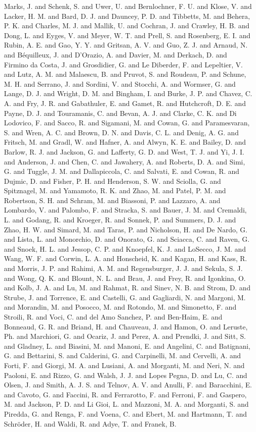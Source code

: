 {Marks, J. and Schenk, S. and Uwer, U. and Bernlochner, F. U. and Klose, V. and Lacker, H. M. and Bard, D. J. and Dauncey, P. D. and Tibbetts, M. and Behera, P. K. and Charles, M. J. and Mallik, U. and Cochran, J. and Crawley, H. B. and Dong, L. and Eyges, V. and Meyer, W. T. and Prell, S. and Rosenberg, E. I. and Rubin, A. E. and Gao, Y. Y. and Gritsan, A. V. and Guo, Z. J. and Arnaud, N. and Béquilleux, J. and D’Orazio, A. and Davier, M. and Derkach, D. and Firmino da Costa, J. and Grosdidier, G. and Le Diberder, F. and Lepeltier, V. and Lutz, A. M. and Malaescu, B. and Pruvot, S. and Roudeau, P. and Schune, M. H. and Serrano, J. and Sordini, V. and Stocchi, A. and Wormser, G. and Lange, D. J. and Wright, D. M. and Bingham, I. and Burke, J. P. and Chavez, C. A. and Fry, J. R. and Gabathuler, E. and Gamet, R. and Hutchcroft, D. E. and Payne, D. J. and Touramanis, C. and Bevan, A. J. and Clarke, C. K. and Di Lodovico, F. and Sacco, R. and Sigamani, M. and Cowan, G. and Paramesvaran, S. and Wren, A. C. and Brown, D. N. and Davis, C. L. and Denig, A. G. and Fritsch, M. and Gradl, W. and Hafner, A. and Alwyn, K. E. and Bailey, D. and Barlow, R. J. and Jackson, G. and Lafferty, G. D. and West, T. J. and Yi, J. I. and Anderson, J. and Chen, C. and Jawahery, A. and Roberts, D. A. and Simi, G. and Tuggle, J. M. and Dallapiccola, C. and Salvati, E. and Cowan, R. and Dujmic, D. and Fisher, P. H. and Henderson, S. W. and Sciolla, G. and Spitznagel, M. and Yamamoto, R. K. and Zhao, M. and Patel, P. M. and Robertson, S. H. and Schram, M. and Biassoni, P. and Lazzaro, A. and Lombardo, V. and Palombo, F. and Stracka, S. and Bauer, J. M. and Cremaldi, L. and Godang, R. and Kroeger, R. and Sonnek, P. and Summers, D. J. and Zhao, H. W. and Simard, M. and Taras, P. and Nicholson, H. and De Nardo, G. and Lista, L. and Monorchio, D. and Onorato, G. and Sciacca, C. and Raven, G. and Snoek, H. L. and Jessop, C. P. and Knoepfel, K. J. and LoSecco, J. M. and Wang, W. F. and Corwin, L. A. and Honscheid, K. and Kagan, H. and Kass, R. and Morris, J. P. and Rahimi, A. M. and Regensburger, J. J. and Sekula, S. J. and Wong, Q. K. and Blount, N. L. and Brau, J. and Frey, R. and Igonkina, O. and Kolb, J. A. and Lu, M. and Rahmat, R. and Sinev, N. B. and Strom, D. and Strube, J. and Torrence, E. and Castelli, G. and Gagliardi, N. and Margoni, M. and Morandin, M. and Posocco, M. and Rotondo, M. and Simonetto, F. and Stroili, R. and Voci, C. and del Amo Sanchez, P. and Ben-Haim, E. and Bonneaud, G. R. and Briand, H. and Chauveau, J. and Hamon, O. and Leruste, Ph. and Marchiori, G. and Ocariz, J. and Perez, A. and Prendki, J. and Sitt, S. and Gladney, L. and Biasini, M. and Manoni, E. and Angelini, C. and Batignani, G. and Bettarini, S. and Calderini, G. and Carpinelli, M. and Cervelli, A. and Forti, F. and Giorgi, M. A. and Lusiani, A. and Morganti, M. and Neri, N. and Paoloni, E. and Rizzo, G. and Walsh, J. J. and Lopes Pegna, D. and Lu, C. and Olsen, J. and Smith, A. J. S. and Telnov, A. V. and Anulli, F. and Baracchini, E. and Cavoto, G. and Faccini, R. and Ferrarotto, F. and Ferroni, F. and Gaspero, M. and Jackson, P. D. and Li Gioi, L. and Mazzoni, M. A. and Morganti, S. and Piredda, G. and Renga, F. and Voena, C. and Ebert, M. and Hartmann, T. and Schröder, H. and Waldi, R. and Adye, T. and Franek, B. }
